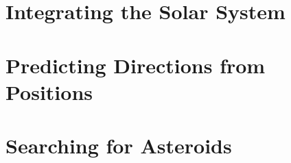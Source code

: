 \documentclass[11pt]{gsasthesis} %
\begin{document}
\chapter{Integrating the Solar System}\label{ch:1}


\chapter{Predicting Directions from Positions}\label{ch:2}


\chapter{Searching for Asteroids}\label{ch:3}




\begin{singlespacing}
\renewcommand{\bibname}{References}

% 
% 

\end{singlespacing}

% 
\end{document}
